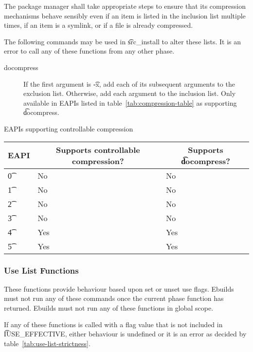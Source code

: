 The package manager shall take appropriate steps to ensure that its compression mechanisms behave
sensibly even if an item is listed in the inclusion list multiple times, if an item is a symlink,
or if a file is already compressed.

The following commands may be used in \t{src\_install} to alter these lists. It is an error to call
any of these functions from any other phase.

\begin{description}
\item[docompress] If the first argument is \t{-x}, add each of its subsequent arguments to the
exclusion list. Otherwise, add each argument to the inclusion list. Only available in EAPIs listed
in table~\ref{tab:compression-table} as supporting \t{docompress}.
\end{description}

\begin{centertable}{EAPIs supporting controllable compression} \label{tab:compression-table}
    \begin{tabular}{ l l l }
        \toprule
            \multicolumn{1}{c}{\textbf{EAPI}} &
            \multicolumn{1}{c}{\textbf{Supports controllable compression?}} &
            \multicolumn{1}{c}{\textbf{Supports \t{docompress}?}} \\
            \midrule
    \t{0} & No & No \\
    \t{1} & No & No \\
    \t{2} & No & No \\
    \t{3} & No & No \\
    \t{4} & Yes & Yes \\
    \t{5} & Yes & Yes \\
    \bottomrule
    \end{tabular}
\end{centertable}

\subsubsection{Use List Functions}
These functions provide behaviour based upon set or unset use flags. Ebuilds must not run any of
these commands once the current phase function has returned. Ebuilds must not run any of these
functions in global scope.

If any of these functions is called with a flag value that is not included in \t{IUSE\_EFFECTIVE},
either behaviour is undefined or it is an error as decided by table~\ref{tab:use-list-strictness}.


